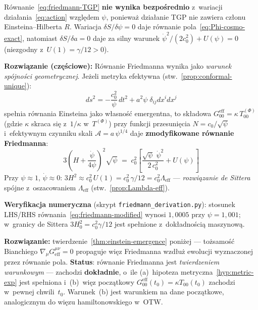 \begin{remark}\label{rem:friedmann-status}
R\'ownanie~\eqref{eq:friedmann-TGP} \textbf{nie wynika bezpo\'srednio}
z~wariacji dzia\l{}ania~\eqref{eq:action} wzgl\k{e}dem $\psi$,
poniewa\.z dzia\l{}anie TGP nie zawiera cz\l{}onu Einsteina--Hilberta $R$.
Wariacja $\delta S/\delta\psi = 0$ daje r\'ownanie
pola~\eqref{eq:Phi-cosmo-exact}, natomiast $\delta S/\delta a = 0$
daje za silny warunek $\dot\psi^2/(2 c_0^2) + U(\psi) = 0$
(niezgodny z~$U(1) = \gamma/12 > 0$).

\textbf{Rozwi\k{a}zanie (cz\k{e}\'sciowe):}
R\'ownanie Friedmanna wynika jako \emph{warunek sp\'ojno\'sci geometrycznej}.
Je\.zeli metryka efektywna (stw.~\ref{prop:conformal-unique}):
\[
  ds^2 = -\frac{c_0^2}{\psi}\,dt^2 + a^2\psi\;\delta_{ij}dx^i dx^j
\]
spe\l{}nia r\'ownania Einsteina jako w\l{}asno\'s\'c emergentna,
to sk\l{}adowa $G^{\mathrm{eff}}_{00} = \kappa\,T_{00}^{(\Phi)}$
(gdzie $\kappa$ skraca si\k{e} z~$1/\kappa$ w~$T^{(\Phi)}$)
przy funkcji przesuni\k{e}cia $N = c_0/\sqrt{\psi}$
i~efektywnym czynniku skali $\mathcal{A} = a\,\psi^{1/4}$
daje \textbf{zmodyfikowane r\'ownanie Friedmanna}:
\begin{equation}\label{eq:friedmann-modified}
  \boxed{
    3\!\left(H + \frac{\dot\psi}{4\psi}\right)^{\!2}\!\sqrt\psi
    \;=\; c_0^2\!\left[
      \frac{\sqrt\psi\;\dot\psi^2}{2\,c_0^2} + U(\psi)
    \right]
  }
\end{equation}
Przy $\psi \approx 1$, $\dot\psi \approx 0$:
$3H^2 \approx c_0^2\,U(1) = c_0^2\,\gamma/12
= c_0^2\Lambda_{\mathrm{eff}}$
--- \emph{rozwi\k{a}zanie de Sittera} sp\'ojne
z~oszacowaniem $\Lambda_{\mathrm{eff}}$
(stw.~\ref{prop:Lambda-eff}).

\textbf{Weryfikacja numeryczna} (skrypt \texttt{friedmann\_derivation.py}):
stosunek LHS/RHS r\'ownania~\eqref{eq:friedmann-modified}
wynosi $1{,}0005$ przy $\psi = 1{,}001$; w~granicy de Sittera
$3H_0^2 = c_0^2\gamma/12$ jest spe\l{}nione
z~dok\l{}adno\'sci\k{a} maszynow\k{a}.

\textbf{Rozwi\k{a}zanie:} twierdzenie~\ref{thm:einstein-emergence}
poni\.zej --- to\.zsamo\'s\'c Bianchiego
$\nabla_\mu G^{\mu\nu}_{\mathrm{eff}} = 0$
propaguje wi\k{e}z Friedmanna wzd\l{}u\.z ewolucji
wyznaczonej przez r\'ownanie pola.
\textbf{Status}: r\'ownanie Friedmanna jest
\emph{twierdzeniem warunkowym} ---
zachodzi \textbf{dok\l{}adnie}, o~ile
(a)~hipoteza metryczna~\ref{hyp:metric-exp}
jest spe\l{}niona i~(b)~wi\k{e}z pocz\k{a}tkowy
$G_{00}^{\mathrm{eff}}(t_0) = \kappa T_{00}(t_0)$
zachodzi w~pewnej chwili~$t_0$.
Warunek~(b) jest warunkiem na dane pocz\k{a}tkowe,
analogicznym do wi\k{e}zu hamiltonowskiego w~OTW.
\end{remark}

